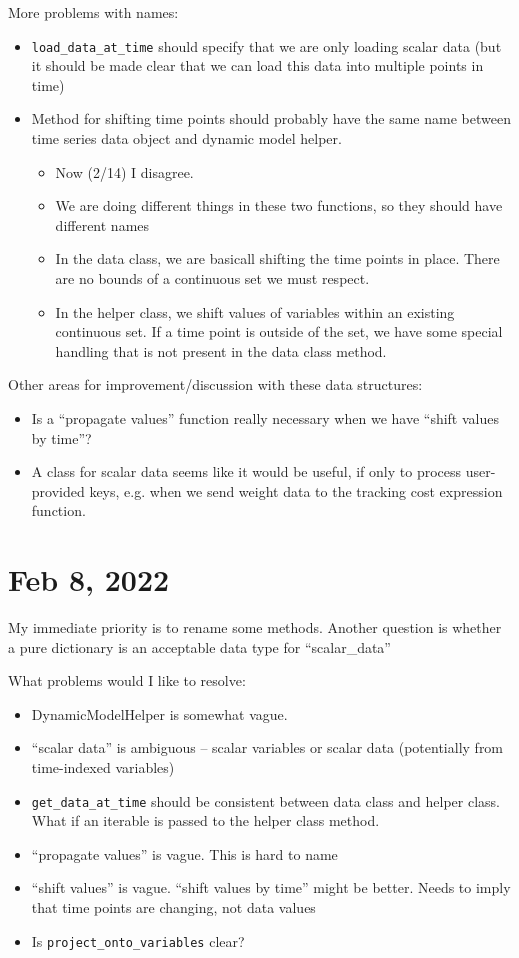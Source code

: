 \documentclass{article}
\begin{document}
More problems with names:
\begin{itemize}
  \item \texttt{load\_data\_at\_time} should specify that we are only
    loading scalar data (but it should be made clear that we can load
    this data into multiple points in time)
  \item Method for shifting time points should probably have the same
    name between time series data object and dynamic model helper.
    \begin{itemize}
      \item Now (2/14) I disagree.
      \item We are doing different things in these two functions, so they
	should have different names
      \item In the data class, we are basicall shifting the time points
	in place. There are no bounds of a continuous set we must
	respect.
      \item In the helper class, we shift values of variables within an
	existing continuous set. If a time point is outside of the set,
	we have some special handling that is not present in the data class
	method.
    \end{itemize}
\end{itemize}

Other areas for improvement/discussion with these data structures:
\begin{itemize}
  \item Is a ``propagate values'' function really necessary when we
    have ``shift values by time''?
  \item A class for scalar data seems like it would be useful, if only to
    process user-provided keys, e.g. when we send weight data to
    the tracking cost expression function.
\end{itemize}

\section{Feb 8, 2022}

My immediate priority is to rename some methods.
Another question is whether a pure dictionary is an acceptable
data type for ``scalar\_data''

What problems would I like to resolve:
\begin{itemize}
  \item DynamicModelHelper is somewhat vague.
  \item ``scalar data'' is ambiguous -- scalar variables or
    scalar data (potentially from time-indexed variables)
  \item \texttt{get\_data\_at\_time} should be consistent
    between data class and helper class. What if an iterable is
    passed to the helper class method.
  \item ``propagate values'' is vague. This is hard to name
  \item ``shift values'' is vague. ``shift values by time''
    might be better. Needs to imply that time points are changing,
    not data values
  \item Is \texttt{project\_onto\_variables} clear?
\end{itemize}
\end{document}

